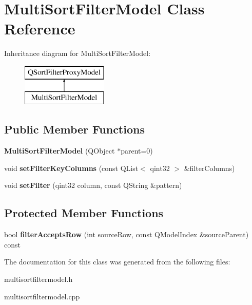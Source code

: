 \hypertarget{classMultiSortFilterModel}{\section{Multi\-Sort\-Filter\-Model Class Reference}
\label{classMultiSortFilterModel}
}
Inheritance diagram for Multi\-Sort\-Filter\-Model\-:\begin{figure}[H]
\begin{center}
\leavevmode
\includegraphics[height=2.000000cm]{classMultiSortFilterModel}
\end{center}
\end{figure}
\subsection*{Public Member Functions}
\begin{DoxyCompactItemize}
\item 
\hypertarget{classMultiSortFilterModel_a699c545b421837b006e064ca6be97016}{{\bfseries Multi\-Sort\-Filter\-Model} (Q\-Object $\ast$parent=0)}\label{classMultiSortFilterModel_a699c545b421837b006e064ca6be97016}

\item 
\hypertarget{classMultiSortFilterModel_a66d2fe690a6603dd520c38a13f2b6a9a}{void {\bfseries set\-Filter\-Key\-Columns} (const Q\-List$<$ qint32 $>$ \&filter\-Columns)}\label{classMultiSortFilterModel_a66d2fe690a6603dd520c38a13f2b6a9a}

\item 
\hypertarget{classMultiSortFilterModel_a924f1e5389e8045f072b7c8eec79b97b}{void {\bfseries set\-Filter} (qint32 column, const Q\-String \&pattern)}\label{classMultiSortFilterModel_a924f1e5389e8045f072b7c8eec79b97b}

\end{DoxyCompactItemize}
\subsection*{Protected Member Functions}
\begin{DoxyCompactItemize}
\item 
\hypertarget{classMultiSortFilterModel_a308fb74918e50bba787fbcb82fb04f91}{bool {\bfseries filter\-Accepts\-Row} (int source\-Row, const Q\-Model\-Index \&source\-Parent) const }\label{classMultiSortFilterModel_a308fb74918e50bba787fbcb82fb04f91}

\end{DoxyCompactItemize}


The documentation for this class was generated from the following files\-:\begin{DoxyCompactItemize}
\item 
multisortfiltermodel.\-h\item 
multisortfiltermodel.\-cpp\end{DoxyCompactItemize}
